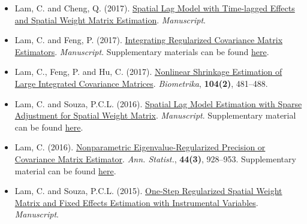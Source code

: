 \documentclass[overlapped,line,letterpaper]{res}
\begin{document}
\begin{resume}
\begin{itemize}
\item[$\bullet$] Lam, C. and Cheng, Q. (2017).
    \href{https://cliffordlam.github.io/files/SpWgtLag2.pdf}{Spatial Lag Model with Time-lagged Effects and Spatial Weight Matrix Estimation}. {\em Manuscript}.

\vspace{12pt}

\item[$\bullet$] Lam, C. and Feng, P. (2017). \href{https://cliffordlam.github.io/files/wgtNERCOME2.pdf}{Integrating Regularized Covariance Matrix Estimators}. {\em Manuscript}. Supplementary materials can be found  \href{https://cliffordlam.github.io/files/wgtNERCOME-proof.pdf}{here}.

\vspace{12pt}

\item[$\bullet$] Lam, C., Feng, P. and Hu, C. (2017). \href{https://academic.oup.com/biomet/article/104/2/481/3746572/Nonlinear-shrinkage-estimation-of-large-integrated?guestAccessKey=552c14b1-c680-49dd-a4be-1ad126695c4c}{Nonlinear Shrinkage Estimation of Large Integrated Covariance Matrices}. {\em Biometrika}, {\bf 104(2)}, 481--488.




\vspace{12pt}

\item[$\bullet$] Lam, C. and Souza, P.C.L. (2016). \href{https://cliffordlam.github.io/files/IVLASSO-SpAdj3.pdf}{Spatial Lag Model Estimation with Sparse Adjustment for Spatial Weight Matrix}. {\em Manuscript}. Supplementary material can be found  \href{https://cliffordlam.github.io/files/Supp-SpAdj3.pdf}{here}.


\vspace{12pt}




\item[$\bullet$] Lam, C. (2016).
\href{https://cliffordlam.github.io/files/AOS1393.pdf}{Nonparametric Eigenvalue-Regularized Precision or Covariance Matrix Estimator}. {\em Ann. Statist.}, {\bf 44(3)}, 928--953. Supplementary material can be found  \href{https://cliffordlam.github.io/files/Supp-NERCOME.pdf}{here}.


\vspace{12pt}

\item[$\bullet$] Lam, C. and Souza, P.C.L. (2015).
\href{https://cliffordlam.github.io/files/IVRSM.pdf}{One-Step Regularized Spatial Weight Matrix and Fixed
Effects Estimation with Instrumental Variables}. {\em Manuscript}.



\end{itemize}
\end{resume}
\end{document}
